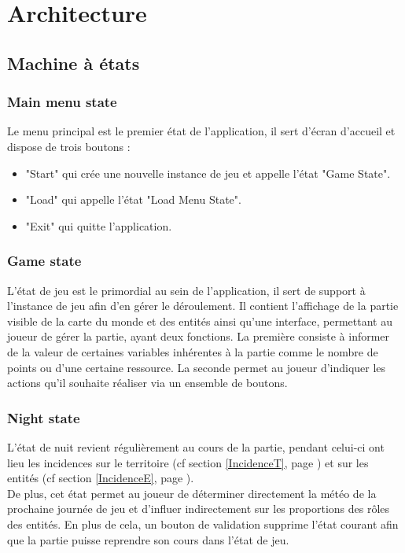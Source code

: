 \documentclass[a4paper]{memoir}
\begin{document}
		\section{Architecture}
		
			\subsection{Machine à états}
			
				\subsubsection{Main menu state}
					Le menu principal est le premier état de l’application, il sert d’écran d’accueil et dispose de trois boutons :
					\begin{itemize}[label=$\bullet$]
						\item "Start" qui crée une nouvelle instance de jeu et appelle l’état "Game State".
						\item "Load" qui appelle l’état "Load Menu State".
						\item "Exit" qui quitte l’application.
					\end{itemize}
					
				\subsubsection{Game state}
					L’état de jeu est le primordial au sein de l’application, il sert de support à l’instance de jeu afin d’en gérer le déroulement. Il contient l’affichage de la partie visible de la carte du monde et des entités ainsi qu’une interface, permettant au joueur de gérer la partie, ayant deux fonctions. La première consiste à informer de la valeur de certaines variables inhérentes à la partie comme le nombre de points ou d’une certaine ressource. La seconde permet au joueur d’indiquer les actions qu’il souhaite réaliser via un ensemble de boutons.
					
				\subsubsection{Night state}
					L’état de nuit revient régulièrement au cours de la partie, pendant celui-ci ont lieu les incidences sur le territoire (cf section \ref{IncidenceT}, page \pageref{IncidenceT}) et sur les entités (cf    section \ref{IncidenceE}, page \pageref{IncidenceE}).\\
					De plus, cet état permet au joueur de déterminer directement la météo de la prochaine journée de jeu et d’influer indirectement sur les proportions des rôles des entités. En plus de cela, un bouton de validation supprime l’état courant afin que la partie puisse reprendre son cours dans l’état de jeu.
					
\end{document}
